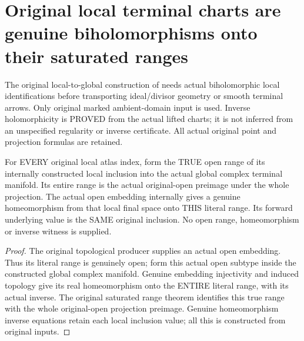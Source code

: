 \section{Original local terminal charts are genuine biholomorphisms onto their saturated ranges}

The original local-to-global construction of
\cite{bierstone-milman08-functoriality,wlodarczyk05-hironaka} needs actual
biholomorphic local identifications before transporting ideal/divisor
geometry or smooth terminal arrows. Only original marked ambient-domain
input is used. Inverse holomorphicity is PROVED from the actual lifted
charts; it is not inferred from an unspecified regularity or inverse
certificate. All actual original point and projection formulas are retained.

\begin{definition}
\label{hir:original-terminal-local-actual-range-homeomorphism}
\leanok
{}
For EVERY original local atlas index, form the TRUE open range of its
internally constructed local inclusion into the actual global complex
terminal manifold. Its entire range is the actual original-open preimage
under the whole projection. The actual open embedding internally gives
a genuine homeomorphism from that local final space onto THIS literal
range. Its forward underlying value is the SAME original inclusion.
No open range, homeomorphism or inverse witness is supplied.
\end{definition}
\begin{proof}
The original topological producer supplies an actual open embedding.
Thus its literal range is genuinely open; form this actual open subtype
inside the constructed global complex manifold. Genuine embedding
injectivity and induced topology give its real homeomorphism onto the
ENTIRE literal range, with its actual inverse. The original saturated
range theorem identifies this true range with the whole original-open
projection preimage. Genuine homeomorphism inverse equations retain
each local inclusion value; all this is constructed from original inputs.
\end{proof}

